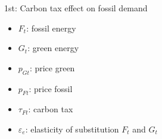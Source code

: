 \documentclass[11pt,aspectratio=169]{beamer}
\begin{document}
\begin{frame}{1st: Carbon tax effect on \alert{fossil demand}}
	\small
	\vspace{22mm}
	\hspace{-4mm}
	\begin{minipage}[t!]{0.24\textwidth}
		\vspace{0mm}
		\begin{itemize}	
			\item[]$F_t$: fossil energy
			\vspace{-2mm}	
			\item[]$G_t$: green energy
		\end{itemize}
	\end{minipage}
	\begin{minipage}[t!]{0.24\textwidth}
		\vspace{0mm}
		\begin{itemize}
			\item[] $p_{Gt}$: price green  \vspace{-2mm}
			\item[] $p_{Ft}$: price fossil
		\end{itemize}
	\end{minipage}
	\begin{minipage}[t!]{0.47\textwidth}
		\vspace{0mm}
		\begin{itemize}
	\item[] $\tau_{Ft}$: carbon tax
	\vspace{-2mm}
			\item[] $\varepsilon_e$: elasticity of substitution $F_t$ and $G_t$
		\end{itemize}
	\end{minipage}
\end{frame}
\end{document}

